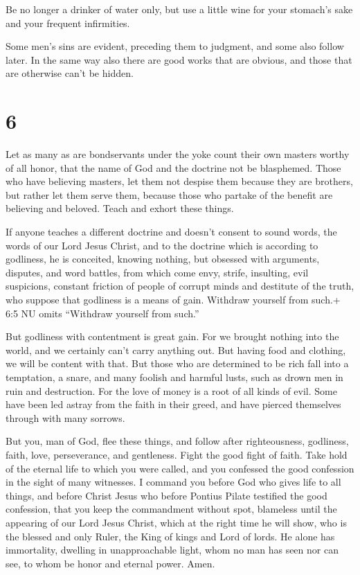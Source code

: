  Be no longer a drinker of water only, but use a little
wine for your stomach's sake and your frequent infirmities.

 Some men's sins are evident, preceding them to judgment,
and some also follow later.  In the same way also there are
good works that are obvious, and those that are otherwise can't be
hidden.

\hypertarget{section-5}{%
\section{6}\label{section-5}}

 Let as many as are bondservants under the yoke count their
own masters worthy of all honor, that the name of God and the doctrine
not be blasphemed.  Those who have believing masters, let
them not despise them because they are brothers, but rather let them
serve them, because those who partake of the benefit are believing and
beloved. Teach and exhort these things.

 If anyone teaches a different doctrine and doesn't consent
to sound words, the words of our Lord Jesus Christ, and to the doctrine
which is according to godliness,  he is conceited, knowing
nothing, but obsessed with arguments, disputes, and word battles, from
which come envy, strife, insulting, evil suspicions, 
constant friction of people of corrupt minds and destitute of the truth,
who suppose that godliness is a means of gain. Withdraw yourself from
such.+ 6:5 NU omits ``Withdraw yourself from such.''

 But godliness with contentment is great gain. 
For we brought nothing into the world, and we certainly can't carry
anything out.  But having food and clothing, we will be
content with that.  But those who are determined to be rich
fall into a temptation, a snare, and many foolish and harmful lusts,
such as drown men in ruin and destruction.  For the love of
money is a root of all kinds of evil. Some have been led astray from the
faith in their greed, and have pierced themselves through with many
sorrows.

 But you, man of God, flee these things, and follow after
righteousness, godliness, faith, love, perseverance, and gentleness.
 Fight the good fight of faith. Take hold of the eternal
life to which you were called, and you confessed the good confession in
the sight of many witnesses.  I command you before God who
gives life to all things, and before Christ Jesus who before Pontius
Pilate testified the good confession,  that you keep the
commandment without spot, blameless until the appearing of our Lord
Jesus Christ,  which at the right time he will show, who is
the blessed and only Ruler, the King of kings and Lord of lords.
 He alone has immortality, dwelling in unapproachable
light, whom no man has seen nor can see, to whom be honor and eternal
power. Amen.

